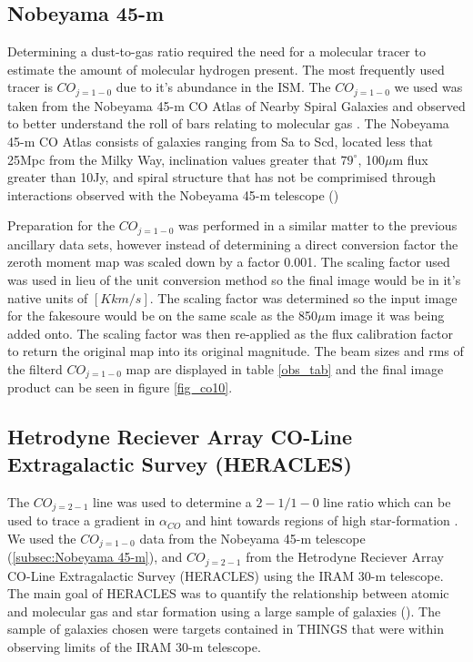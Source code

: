 
\subsection{Nobeyama 45-m}

Determining a dust-to-gas ratio required the need for a molecular tracer to estimate the amount of molecular hydrogen present.  The most frequently used tracer is $CO_{j=1-0}$ due to it's abundance in the ISM.  The $CO_{j=1-0}$ we used was taken from the Nobeyama 45-m CO Atlas of Nearby Spiral Galaxies and observed to better understand the roll of bars relating to molecular gas \protect\citet{kuno2007}.  The Nobeyama 45-m CO Atlas consists of galaxies ranging from Sa to Scd, located less that 25Mpc from the Milky Way, inclination values greater that $79^{\circ}$, 100$\mu$m flux greater than 10Jy, and spiral structure that has not be comprimised through interactions observed with the Nobeyama 45-m telescope (\protect\citet{kuno2007})

Preparation for the $CO_{j=1-0}$ was performed in a similar matter to the previous ancillary data sets, however instead of determining a direct conversion factor the zeroth moment map was scaled down by a factor 0.001.  The scaling factor used was used in lieu of the unit conversion method so the final image would be in it's native units of $[K km/s]$.  The scaling factor was determined so the input image for the fakesoure would be on the same scale as the 850$\mu$m image it was being added onto.  The scaling factor was then re-applied as the flux calibration factor to return the original map into its original magnitude.  The beam sizes and rms of the filterd $CO_{j=1-0}$ map are displayed in table \ref{obs_tab} and the final image product can be seen in figure \ref{fig_co10}.


\subsection{Hetrodyne Reciever Array CO-Line Extragalactic Survey (HERACLES)}

The $CO_{j=2-1}$ line was used to determine a ${2-1} / {1-0}$ line ratio which can be used to trace a gradient in $\alpha_{CO}$ and hint towards regions of high star-formation \protect\citet{reuter1996}.  We used the $CO_{j=1-0}$ data from the Nobeyama 45-m telescope (\ref{subsec:Nobeyama 45-m}), and $CO_{j=2-1}$ from the Hetrodyne Reciever Array CO-Line Extragalactic Survey (HERACLES) using the IRAM 30-m telescope.  The main goal of HERACLES was to quantify the relationship between atomic and molecular gas and star formation using a large sample of galaxies (\protect\citet{leroy2009}).  The sample of galaxies chosen were targets contained in THINGS that were within observing limits of the IRAM 30-m telescope.

